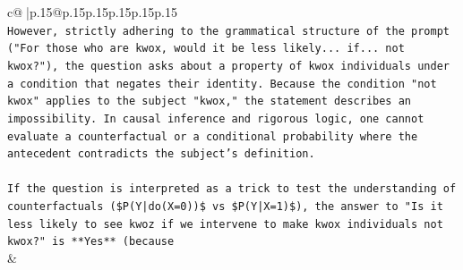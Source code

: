 \documentclass{article}
\begin{document}
{\begin{supertabular}{c@{$\;$}|p{.15\linewidth}@{}p{.15\linewidth}p{.15\linewidth}p{.15\linewidth}p{.15\linewidth}p{.15\linewidth}}
{{{\\ 
\texttt{However, strictly adhering to the grammatical structure of the prompt ("For those who are kwox, would it be less likely... if... not kwox?"), the question asks about a property of kwox individuals under a condition that negates their identity. Because the condition "not kwox" applies to the subject "kwox," the statement describes an impossibility. In causal inference and rigorous logic, one cannot evaluate a counterfactual or a conditional probability where the antecedent contradicts the subject's definition.} \\
\\ 
\texttt{If the question is interpreted as a trick to test the understanding of counterfactuals (\$P(Y|do(X=0))\$ vs \$P(Y|X=1)\$), the answer to "Is it less likely to see kwoz if we intervene to make kwox individuals not kwox?" is **Yes** (because} \\
            }
        }
    }
    & \\ \\


\end{supertabular}}
\end{document}
